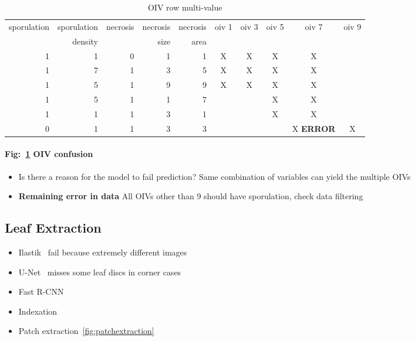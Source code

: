 \documentclass[english]{article}
\begin{document}
\begin{table}[H]
	\centering
	\caption{OIV row multi-value}\label{tab:oivconfusion}
	\begin{tabular}{rrrrrccccc}
		\toprule
		sporulation & sporulation & necrosis & necrosis & necrosis & oiv 1 & oiv 3 & oiv 5 & oiv 7            & oiv 9 \\
		{}          & density     & {}       & size     & area     & {}    & {}    & {}    & {}               & {}    \\
		\midrule
		1           & 1           & 0        & 1        & 1        & X     & X     & X     & X                &       \\
		1           & 7           & 1        & 3        & 5        & X     & X     & X     & X                &       \\
		1           & 5           & 1        & 9        & 9        & X     & X     & X     & X                &       \\
		1           & 5           & 1        & 1        & 7        &       &       & X     & X                &       \\
		1           & 1           & 1        & 3        & 1        &       &       & X     & X                &       \\
		0           & 1           & 1        & 3        & 3        &       &       &       & X \textbf{ERROR} & X     \\
		\bottomrule
	\end{tabular}
\end{table}
\paragraph{Fig:~\ref{tab:oivconfusion} OIV confusion}
\begin{itemize}
	\item Is there a reason for the model to fail prediction? Same combination of variables can yield the multiple OIVs
	\item \textbf{Remaining error in data} All OIVs other than 9 should have sporulation, check data filtering
\end{itemize}


\subsection{Leaf Extraction}

\begin{itemize}
	\item Ilastik~\parencite{bergIlastikInteractiveMachine2019} fail because extremely different images
	\item U-Net~\parencite{ronnebergerUNetConvolutionalNetworks2015} misses some leaf discs in corner cases
	\item Fast R-CNN~\parencite{girshickFastRCNN2015}
	\item Indexation
	\item Patch extraction~\ref{fig:patchextraction}
\end{itemize}
\end{document}
